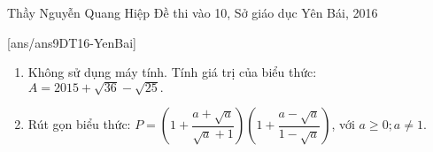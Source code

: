 \begin{name}
{Thầy  Nguyễn Quang Hiệp}
{Đề thi vào 10, Sở giáo dục Yên Bái, 2016}
\end{name}
\setcounter{ex}{0}
[ans/ans9DT16-YenBai]

\begin{ex}%
    \hfill
    \begin{enumerate}
        \item Không sử dụng máy tính. Tính giá trị của biểu thức: $A=2015+\sqrt{36}-\sqrt{25}.$ 
        \item Rút gọn biểu thức: $P=\left(1+\dfrac{a+\sqrt{a}}{\sqrt{a}+1}\right)\left(1+\dfrac{a-\sqrt{a}}{1-\sqrt{a}}\right)$, với $a \geq 0; a \neq 1$.
    \end{enumerate}
\end{ex}

